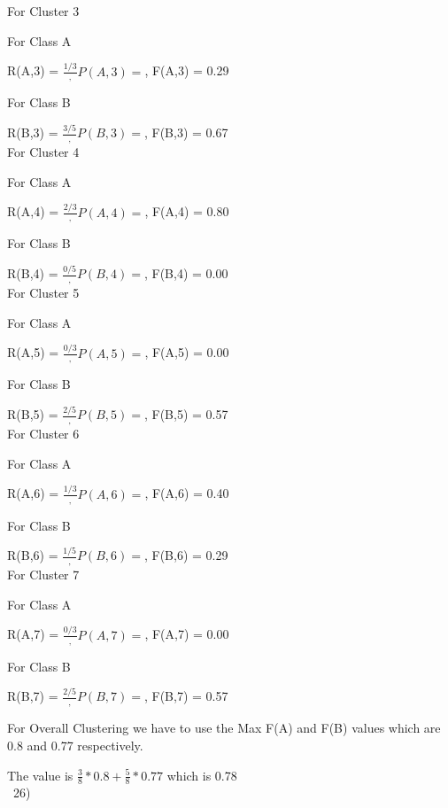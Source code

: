 \documentclass[12pt,english]{article}
\begin{document}
For Cluster 3\par
For Class A\par
R(A,3) = $\frac{1/3}, P(A,3) = $, F(A,3) = 0.29\par
For Class B\par
R(B,3) = $\frac{3/5}, P(B,3) = $, F(B,3) = 0.67\\
For Cluster 4\par
For Class A\par
R(A,4) = $\frac{2/3}, P(A,4) = $, F(A,4) = 0.80\par
For Class B\par
R(B,4) = $\frac{0/5}, P(B,4) = $, F(B,4) = 0.00\\
For Cluster 5\par
For Class A\par
R(A,5) = $\frac{0/3}, P(A,5) = $, F(A,5) = 0.00\par
For Class B\par
R(B,5) = $\frac{2/5}, P(B,5) = $, F(B,5) = 0.57\\
For Cluster 6\par
For Class A\par
R(A,6) = $\frac{1/3}, P(A,6) = $, F(A,6) = 0.40\par
For Class B\par
R(B,6) = $\frac{1/5}, P(B,6) = $, F(B,6) = 0.29\\
For Cluster 7\par
For Class A\par
R(A,7) = $\frac{0/3}, P(A,7) = $, F(A,7) = 0.00\par
For Class B\par
R(B,7) = $\frac{2/5}, P(B,7) = $, F(B,7) = 0.57\par
For Overall Clustering we have to use the Max F(A) and F(B) values which are 0.8 and 0.77 respectively.\par
The value is $\frac{3}{8} * 0.8 +\frac{5}{8} * 0.77$ which is 0.78\\\
26)\\
\end{document}
